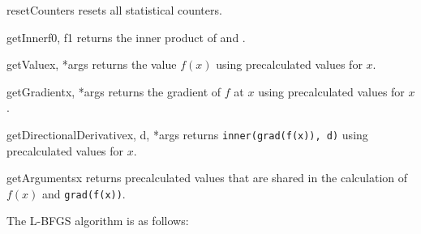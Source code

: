 
\begin{methoddesc}[CostFunction]{resetCounters}{}
    resets all statistical counters.
\end{methoddesc}
%
\begin{methoddesc}[CostFunction]{getInner}{f0, f1}
    returns the inner product of  and .
\end{methoddesc}
%
\begin{methoddesc}[CostFunction]{getValue}{x, *args}
    returns the value $f(x)$ using precalculated values for $x$.
\end{methoddesc}
%
\begin{methoddesc}[CostFunction]{getGradient}{x, *args}
    returns the gradient of $f$ at $x$ using precalculated values for $x$.
\end{methoddesc}
%
\begin{methoddesc}[CostFunction]{getDirectionalDerivative}{x, d, *args}
    returns \texttt{inner(grad(f(x)), d)} using precalculated values for $x$.
\end{methoddesc}
%
\begin{methoddesc}[CostFunction]{getArguments}{x}
    returns precalculated values that are shared in the calculation of $f(x)$
    and \texttt{grad(f(x))}.
\end{methoddesc}

The L-BFGS algorithm is as follows:

